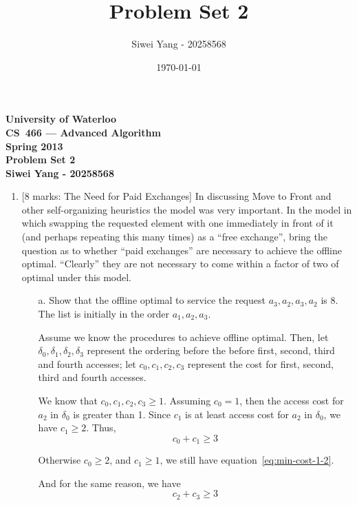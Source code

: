 \documentclass[12pt]{article}
\begin{document}
\begin{center}
\large\bf University of Waterloo\\
CS~466 --- Advanced Algorithm\\
Spring 2013\\
Problem Set 2\\
Siwei Yang - 20258568\\
\end{center}
\bigskip

\title{Problem Set 2}
\date{\today}
\author{Siwei Yang - 20258568}

\begin{enumerate}

\item{} [8 marks: The Need for Paid Exchanges]
In discussing Move to Front and other self-organizing heuristics the model was very important. In the model in which swapping the requested element with one immediately in front of it (and perhaps repeating this many times) as a “free exchange”, bring the question as to whether “paid exchanges” are necessary to achieve the offline optimal. “Clearly” they are not necessary to come within a factor of two of optimal under this model.

\begin{itemize}

\item[a.] Show that the offline optimal to service the request $a_{3},a_{2},a_{3},a_{2}$ is 8. The list is initially in the order $a_{1},a_{2},a_{3}$.

Assume we know the procedures to achieve offline optimal. Then, let $\delta_{0}, \delta_{1}, \delta_{2}, \delta_{3}$ represent the ordering before the before first, second, third and fourth accesses; let $c_{0}, c_{1}, c_{2}, c_{3}$ represent the cost for first, second, third and fourth accesses.

We know that $c_{0}, c_{1}, c_{2}, c_{3} \geq 1$. Assuming $c_{0} = 1$, then the access cost for $a_{2}$ in $\delta_{0}$ is greater than 1. Since $c_{1}$ is at least access cost for $a_{2}$ in $\delta_{0}$, we have $c_{1} \geq 2$. Thus,
\begin{equation} \label{eq:min-cost-1-2}
c_{0} + c_{1} \geq 3
\end{equation}

Otherwise  $c_{0}  \geq 2$, and $c_{1} \geq 1$, we still have equation~\ref{eq:min-cost-1-2}.

And for the same reason, we have
\begin{equation} \label{eq:min-cost-3-4}
c_{2} + c_{3} \geq 3
\end{equation}


\end{itemize}
\end{enumerate}
\end{document}
